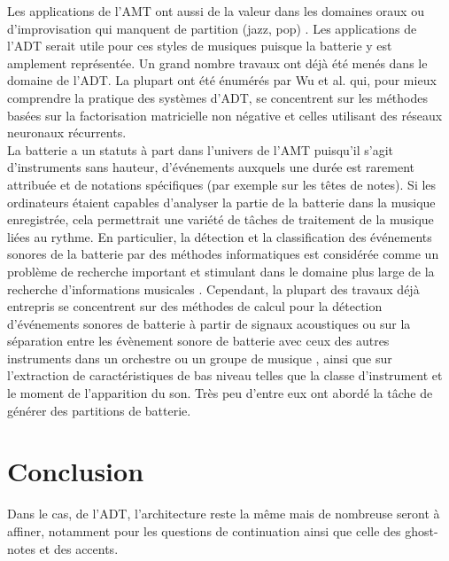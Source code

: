 Les applications de l’AMT ont aussi de la valeur dans les domaines oraux ou d’improvisation qui manquent de partition (jazz, pop) \cite{article1}. Les applications de l’ADT serait utile pour ces styles de musiques puisque la batterie y est amplement représentée. Un grand nombre travaux ont déjà été menés dans le domaine de l’ADT. La plupart ont été énumérés par Wu et al. \cite{8350302} qui, pour mieux comprendre la pratique des systèmes d’ADT, se concentrent sur les méthodes basées sur la factorisation matricielle non négative et celles utilisant des réseaux neuronaux récurrents.\\
La batterie a un statuts à part dans l’univers de l’AMT puisqu'il s'agit d'instruments sans hauteur, d'événements auxquels une durée est rarement attribuée et de notations spécifiques (par exemple sur les têtes de notes). Si les ordinateurs étaient capables d'analyser la partie de la batterie dans la musique enregistrée, cela permettrait une variété de tâches de traitement de la musique liées au rythme. En particulier, la détection et la classification des événements sonores de la batterie par des méthodes informatiques est considérée comme un problème de recherche important et stimulant dans le domaine plus large de la recherche d'informations musicales \cite{8350302}. Cependant, la plupart des travaux déjà entrepris se concentrent sur des méthodes de calcul pour la détection d'événements sonores de batterie à partir de signaux acoustiques ou sur la séparation entre les évènement sonore de batterie avec ceux des autres instruments dans un orchestre ou un groupe de musique \cite{2802}, ainsi que sur l'extraction de caractéristiques de bas niveau telles que la classe d'instrument et le moment de l'apparition du son. Très peu d'entre eux ont abordé la tâche de générer des partitions de batterie.

\section*{Conclusion}
Dans le cas, de l’ADT, l’architecture reste la même mais de nombreuse seront à affiner, notamment pour les questions de continuation ainsi que celle des ghost-notes et des accents.